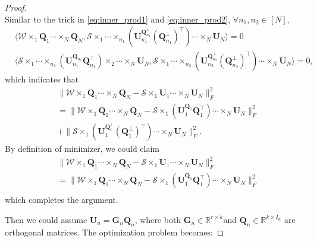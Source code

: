 \begin{proof}
\begin{equation}
\end{equation}
Similar to the trick in \eqref{eq:inner_prod1} and \eqref{eq:inner_prod2}, $\forall n_1, n_2 \in [N]$, 
\begin{equation}
\begin{aligned}
&\langle \mathscr{W}\times_1 \mathbf{Q}_1 \cdots \times_N \mathbf{Q}_N,\mathscr{S} \times_1 \cdots \times_{n_1} (\mathbf{U}_{n_1}^{\mathbf{Q}^\bot_{n_1}}(\mathbf{Q}^\bot_{n_1})^\top)\cdots \times_N \mathbf{U}_N \rangle =0 \\
& \langle \mathscr{S} \times_1 \cdots \times_{n_1} (\mathbf{U}_{n_1}^{\mathbf{Q}_{n_1}}\mathbf{Q}_{n_1}^\top)\times_2\cdots \times_N \mathbf{U}_N, \mathscr{S} \times_1 \cdots \times_{n_2} (\mathbf{U}_{n_2}^{\mathbf{Q}^\bot_{n_2}}(\mathbf{Q}^\bot_{n_2})^\top)\cdots \times_N \mathbf{U}_N \rangle =0,
\end{aligned}
\end{equation}
which indicates that 
\begin{equation}
\begin{aligned}
&\|\mathscr{W}\times_1 \mathbf{Q}_1 \cdots \times_N \mathbf{Q}_N - \mathscr{S} \times_1 \mathbf{U}_1 \cdots \times_N \mathbf{U}_N\|_F^2 \\
& = \|\mathscr{W}\times_1 \mathbf{Q}_1 \cdots \times_N \mathbf{Q}_N - \mathscr{S} \times_1 (\mathbf{U}_1^{\mathbf{Q}_1}\mathbf{Q}_1^\top) \cdots \times_N \mathbf{U}_N\|_F^2\\
& + \|\mathscr{S} \times_1 (\mathbf{U}_1^{\mathbf{Q}^\bot_1}(\mathbf{Q}^\bot_1)^\top) \cdots \times_N \mathbf{U}_N\|_F^2.
\end{aligned}
\end{equation}
By definition of minimizer, we could claim
\begin{equation}
\begin{aligned}
&\|\mathscr{W}\times_1 \mathbf{Q}_1 \cdots \times_N \mathbf{Q}_N - \mathscr{S} \times_1 \mathbf{U}_1 \cdots \times_N \mathbf{U}_N\|_F^2 \\
&= \|\mathscr{W}\times_1 \mathbf{Q}_1 \cdots \times_N \mathbf{Q}_N - \mathscr{S} \times_1 (\mathbf{U}_1^{\mathbf{Q}_1}\mathbf{Q}_1^\top ) \cdots \times_N \mathbf{U}_N\|_F^2\\
\end{aligned}
\end{equation}
which completes the argument.\par 
Then we could assume $\mathbf{U}_n = \mathbf{G}_n\mathbf{Q}_n$, where both $\mathbf{G}_n \in \mathbb{R}^{r\times k}$and $ \mathbf{Q}_n \in \mathbb{R}^{k\times I_n}$ are orthogonal matrices. The optimization problem becomes:

\end{proof}
